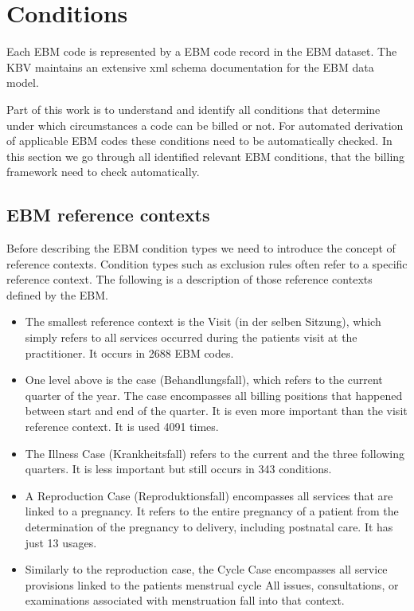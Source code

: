 \section{Conditions}\label{sec:ebm-conditions}


Each EBM code is represented by a EBM code record in the EBM dataset.
The KBV maintains an extensive xml schema documentation for the EBM data model.


Part of this work is to understand and identify all conditions that determine under which circumstances a code can be billed or not.
For automated derivation of applicable EBM codes these conditions need to be automatically checked.
In this section we go through all identified relevant EBM conditions, that the billing framework need to check automatically.


\subsection{EBM reference contexts}
Before describing the EBM condition types we need to introduce the concept of reference contexts.
Condition types such as exclusion rules often refer to a specific reference context.
The following is a description of those reference contexts defined by the EBM.
\begin{itemize}
    \item The smallest reference context is the Visit (in der selben Sitzung), which simply refers to all services occurred during the patients visit at the practitioner.
    It occurs in 2688 EBM codes.
    \item One level above is the case (Behandlungsfall), which refers to the current quarter of the year.
     The case encompasses all billing positions that happened between start and end of the quarter.
    It is even more important than the visit reference context.
    It is used 4091 times.
    \item The Illness Case (Krankheitsfall) refers to the current and the three following quarters.
    It is less important but still occurs in 343 conditions.
    \item A Reproduction Case (Reproduktionsfall) encompasses all services that are linked to a pregnancy.
    It refers to the entire pregnancy of a patient from the determination of the pregnancy to delivery, including postnatal care.
    It has just 13 usages.
    \item Similarly to the reproduction case, the Cycle Case encompasses all service provisions linked to the patients menstrual cycle
    All issues, consultations, or examinations associated with menstruation fall into that context.
\end{itemize}
